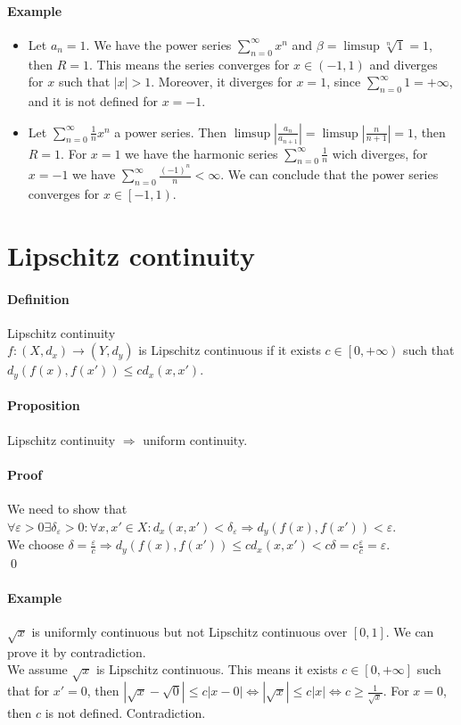 \documentclass{article}
\newcommand{\DS}{\displaystyle}
\newcommand{\abs}[1]{\left|#1\right|}
\newcommand{\func}[3]{#1 : #2 \rightarrow #3}
\newcommand{\pseries}[1]{\sum_{n=0}^\infty #1}
\newcommand{\intcc}[1]{\left[#1\right]}
\newcommand{\intco}[1]{\left[#1\right)}
\newcommand{\intoo}[1]{\left(#1\right)}
\newcommand{\Ep}{\varepsilon}
\newcommand{\Def}{\paragraph{Definition}}
\newcommand{\Proposition}{\paragraph{Proposition}}
\newcommand{\Proof}{\paragraph{Proof}}
\newcommand{\Example}{\paragraph{Example}}
\begin{document}
  \Example
  \begin{itemize}
    \item %
    Let $a_n = 1$. We have the power series $\DS \pseries{x^n}$ and $\beta =
    \limsup \sqrt[n]{1} = 1$, then $R = 1$. This means the series converges for
    $x \in \intoo{-1,1}$ and diverges for $x$ such that $|x| > 1$. Moreover, it
    diverges for $x = 1$, since $\DS \pseries{1} = +\infty$, and it is not
    defined for $x = -1$.

    \item %
    Let $\DS \pseries{\frac{1}{n}x^n}$ a power series. Then $\limsup
    \abs{\frac{a_n}{a_{n+1}}} = \limsup \abs{\frac{n}{n+1}} = 1$, then $R = 1$.
    For $x = 1$ we have the harmonic series $\DS \pseries{\frac{1}{n}}$ wich
    diverges, for $x = -1$ we have $\DS \pseries{\frac{(-1)^n}{n}} < \infty$. We
    can conclude that the power series converges for $x \in \intco{-1,1}$.
  \end{itemize}


\section{Lipschitz continuity}

  \Def Lipschitz continuity
\\$\func{f}{(X,d_x)}{(Y,d_y)}$ is Lipschitz continuous if it exists $c \in
  \intco{0,+\infty}$ such that $d_y(f(x),f(x')) \leq c d_x(x,x')$.

  \Proposition Lipschitz continuity $\Rightarrow$ uniform continuity.

  \Proof We need to show that $\forall \Ep > 0 \exists \delta_\Ep > 0 : \forall
  x, x' \in X : d_x(x,x') < \delta_\Ep \Rightarrow d_y(f(x),f(x')) < \Ep$.
\\We choose $\delta = \frac{\Ep}{c} \Rightarrow d_y(f(x),f(x')) \leq
  c d_x(x,x') < c \delta = c \frac{\Ep}{c} = \Ep$.
\\\qed

  \Example $\sqrt{x}$ is uniformly continuous but not Lipschitz continuous over
  $\intcc{0,1}$. We can prove it by contradiction.
\\We assume $\sqrt{x}$ is Lipschitz continuous. This means it exists $c \in
  \intcc{0,+\infty}$ such that for $x' = 0$, then $|\sqrt{x} - \sqrt{0}| \leq
  c |x - 0| \iff |\sqrt{x}| \leq c |x| \iff c \geq \frac{1}{\sqrt{x}}$. For
  $x = 0$, then $c$ is not defined. Contradiction.
\end{document}

